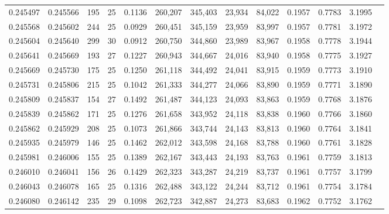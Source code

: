 \begin{tabular}{rrrrrrrrrrrrr}
0.245497 & 0.245566 &   195 &  25 &                                     0.1136 & 260,207 & 345,403 &  23,934 &  84,022 & 0.1957 & 0.7783 & 3.1995 \\
0.245568 & 0.245602 &   244 &  25 &                                     0.0929 & 260,451 & 345,159 &  23,959 &  83,997 & 0.1957 & 0.7781 & 3.1972 \\
0.245604 & 0.245640 &   299 &  30 &                                     0.0912 & 260,750 & 344,860 &  23,989 &  83,967 & 0.1958 & 0.7778 & 3.1944 \\
0.245641 & 0.245669 &   193 &  27 &                                     0.1227 & 260,943 & 344,667 &  24,016 &  83,940 & 0.1958 & 0.7775 & 3.1927 \\
0.245669 & 0.245730 &   175 &  25 &                                     0.1250 & 261,118 & 344,492 &  24,041 &  83,915 & 0.1959 & 0.7773 & 3.1910 \\
0.245731 & 0.245806 &   215 &  25 &                                     0.1042 & 261,333 & 344,277 &  24,066 &  83,890 & 0.1959 & 0.7771 & 3.1890 \\
0.245809 & 0.245837 &   154 &  27 &                                     0.1492 & 261,487 & 344,123 &  24,093 &  83,863 & 0.1959 & 0.7768 & 3.1876 \\
0.245839 & 0.245862 &   171 &  25 &                                     0.1276 & 261,658 & 343,952 &  24,118 &  83,838 & 0.1960 & 0.7766 & 3.1860 \\
0.245862 & 0.245929 &   208 &  25 &                                     0.1073 & 261,866 & 343,744 &  24,143 &  83,813 & 0.1960 & 0.7764 & 3.1841 \\
0.245935 & 0.245979 &   146 &  25 &                                     0.1462 & 262,012 & 343,598 &  24,168 &  83,788 & 0.1960 & 0.7761 & 3.1828 \\
0.245981 & 0.246006 &   155 &  25 &                                     0.1389 & 262,167 & 343,443 &  24,193 &  83,763 & 0.1961 & 0.7759 & 3.1813 \\
0.246010 & 0.246041 &   156 &  26 &                                     0.1429 & 262,323 & 343,287 &  24,219 &  83,737 & 0.1961 & 0.7757 & 3.1799 \\
0.246043 & 0.246078 &   165 &  25 &                                     0.1316 & 262,488 & 343,122 &  24,244 &  83,712 & 0.1961 & 0.7754 & 3.1784 \\
0.246080 & 0.246142 &   235 &  29 &                                     0.1098 & 262,723 & 342,887 &  24,273 &  83,683 & 0.1962 & 0.7752 & 3.1762 \\

\end{tabular}
